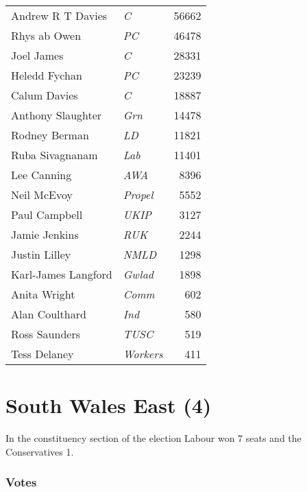 {\footnotesize
\begin{tabular*}{\columnwidth}{@{\extracolsep{\fill}} p{} >{\itshape}l r @{\extracolsep{\fill}}}
	Andrew R T Davies & C & 56662\\%
	Rhys ab Owen & PC & 46478\\%
	Joel James & C & 28331\\%
	Heledd Fychan & PC & 23239\\%
	\hline
	Calum Davies & C & 18887\\
	Anthony Slaughter & Grn & 14478\\
	Rodney Berman & LD & 11821\\
	Ruba Sivagnanam & Lab & 11401\\
	Lee Canning & AWA & 8396\\
	Neil McEvoy & Propel & 5552\\
	Paul Campbell & UKIP & 3127\\
	Jamie Jenkins & RUK & 2244\\
	Justin Lilley & NMLD & 1298\\
	Karl-James Langford & Gwlad & 1898\\
	Anita Wright & Comm & 602\\
	Alan Coulthard & Ind & 580\\
	Ross Saunders & TUSC & 519\\
	Tess Delaney & Workers & 411\\
\end{tabular*}

}

\section[South Wales East]{South Wales East (4)}

In the constituency section of the election Labour won 7 seats and the Conservatives 1.

\subsubsection*{Votes}

